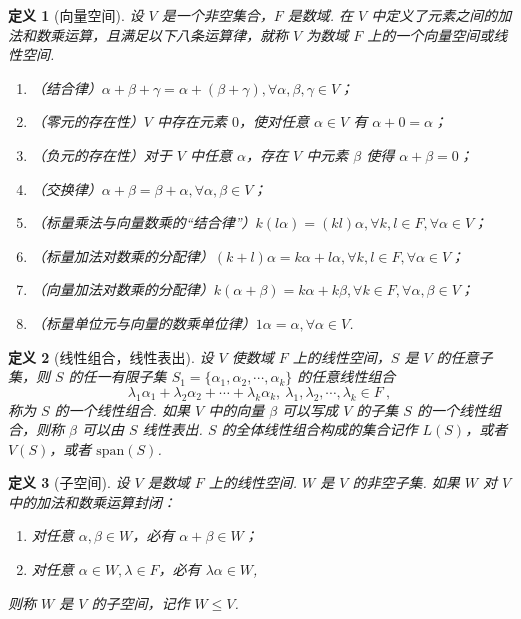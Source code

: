 \documentclass[zihao=-4,UTF8,linespread=1.8,nothm]{aytony_base}
\newtheorem{definition}{\indent 定义}[subsection]
\begin{document}
\begin{definition}[向量空间]
    设 $V$ 是一个非空集合，$F$ 是数域. 在 $V$ 中定义了元素之间的加法和数乘运算，且满足以下八条运算律，就称 $V$ 为数域 $F$ 上的一个向量空间或线性空间.
    \begin{enumerate}[nosep]
        \item （结合律）$\alpha + \beta + \gamma = \alpha + (\beta + \gamma), \forall \alpha, \beta, \gamma \in V$；
        \item （零元的存在性）$V$ 中存在元素 $0$，使对任意 $\alpha\in V$ 有 $\alpha + 0 = \alpha$；
        \item （负元的存在性）对于 $V$ 中任意 $\alpha$，存在 $V$ 中元素 $\beta$ 使得 $\alpha + \beta = 0$；
        \item （交换律）$\alpha + \beta = \beta + \alpha, \forall \alpha, \beta \in V$；
        \item （标量乘法与向量数乘的“结合律”）$k(l \alpha) = (kl)\alpha, \forall k, l \in F, \forall \alpha \in V $；
        \item （标量加法对数乘的分配律）$(k+l)\alpha = k \alpha + l \alpha, \forall k, l \in F, \forall \alpha \in V$；
        \item （向量加法对数乘的分配律）$k (\alpha + \beta) = k \alpha + k \beta, \forall k \in F, \forall \alpha, \beta \in V$；
        \item （标量单位元与向量的数乘单位律）$1\alpha = \alpha, \forall \alpha \in V$.
    \end{enumerate}
\end{definition}

\begin{definition}[线性组合，线性表出]
    设 $V$ 使数域 $F$ 上的线性空间，$S$ 是 $V$ 的任意子集，则 $S$ 的任一有限子集 $S_1 = \{\alpha_1, \alpha_2, \cdots, \alpha_k\}$ 的任意线性组合 $$
        \lambda_1 \alpha_1 + \lambda_2 \alpha_2 + \cdots + \lambda_k \alpha_k,\ \lambda_1, \lambda_2, \cdots, \lambda_k \in F\ ,
    $$ 称为 $S$ 的一个线性组合. 如果 $V$ 中的向量 $\beta$ 可以写成 $V$ 的子集 $S$ 的一个线性组合，则称 $\beta$ 可以由 $S$ 线性表出. $S$ 的全体线性组合构成的集合记作 $L(S)$，或者 $V(S)$，或者 $\mathrm{span}(S)$.
\end{definition}

\begin{definition}[子空间]
    设 $V$ 是数域 $F$ 上的线性空间. $W$ 是 $V$ 的非空子集. 如果 $W$ 对 $V$ 中的加法和数乘运算封闭：
    \begin{enumerate}[nosep]
        \item 对任意 $\alpha, \beta \in W$，必有 $\alpha + \beta \in W$；
        \item 对任意 $\alpha\in W,\lambda \in F$，必有 $\lambda \alpha \in W$,
    \end{enumerate}
    则称 $W $ 是 $V$ 的子空间，记作 $W \leqslant V$.
\end{definition}
\end{document}

